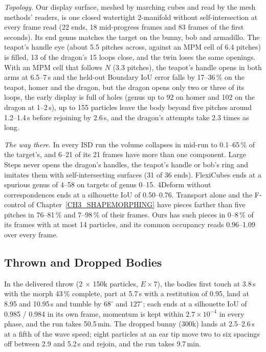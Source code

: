 \textit{Topology.} Our display surface, meshed by marching cubes and read by the mesh methods' readers, is one closed watertight
2-manifold without self-intersection at every frame read (22 ends, 18 mid-progress frames and 83 frames of the first seconds).
Its end genus matches the target on the bunny, bob and armadillo. The teapot's handle eye (about 5.5 pitches across, against an
MPM cell of 6.4 pitches) is filled, 13 of the dragon's 15 loops close, and the twin loses the same openings. With an MPM cell
that follows $N$ (3.3 pitches), the teapot's handle opens in both arms at 6.5--7\,s and the held-out Boundary IoU error falls by
17--36\,\% on the teapot, homer and the dragon, but the dragon opens only two or three of its loops, the early display is full of
holes (genus up to 92 on homer and 102 on the dragon at 1--2\,s), up to 155 particles leave the body beyond five pitches around
1.2--1.4\,s before rejoining by 2.6\,s, and the dragon's attempts take 2.3 times as long.

\textit{The way there.} In every ISD run the volume collapses in mid-run to 0.1--65\,\% of the target's, and 6--21 of its 21
frames have more than one component. Large Steps never opens the dragon's handles, the teapot's handle or bob's ring and imitates
them with self-intersecting surfaces (31 of 36 ends). FlexiCubes ends at a spurious genus of 4--58 on targets of genus 0--15.
4Deform without correspondences ends at a silhouette IoU of 0.50--0.76. Transport alone and the F-control of
Chapter~\ref{CH3_SHAPEMORPHING} have pieces farther than five pitches in 76--81\,\% and 7--98\,\% of their frames. Ours has such
pieces in 0--8\,\% of its frames with at most 14 particles, and its common occupancy reads 0.96--1.09 over every frame.

\subsection{Thrown and Dropped Bodies}
In the delivered throw (2 $\times$ 150k particles, $E\times7$), the bodies first touch at 3.8\,s with the morph 43\,\% complete,
part at 5.7\,s with a restitution of 0.95, land at 8.95 and 10.95\,s and tumble by $68^\circ$ and $127^\circ$; each ends at a
silhouette IoU of 0.985 / 0.984 in its own frame, momentum is kept within $2.7\times10^{-4}$ in every phase, and the run takes
50.5\,min. The dropped bunny (300k) lands at 2.5--2.6\,s at a fifth of the wave speed; eight particles at an ear tip move two to
six spacings off between 2.9 and 5.2\,s and rejoin, and the run takes 9.7\,min.

